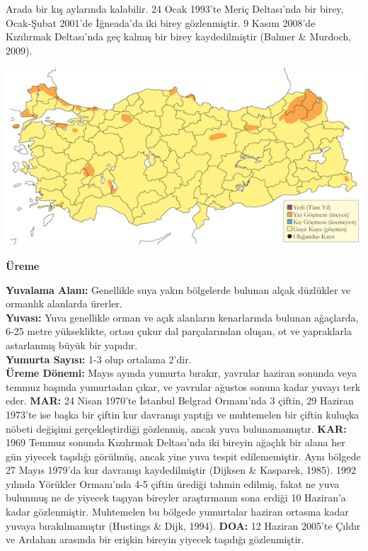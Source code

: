 \documentclass[
  a4paper,
  DIV=11,
  numbers=noendperiod]{scrreprt}
\begin{document}
Arada bir kış aylarında kalabilir. 24 Ocak 1993'te Meriç Deltası'nda bir
birey, Ocak-Şubat 2001'de İğneada'da iki birey gözlenmiştir. 9 Kasım
2008'de Kızılırmak Deltası'nda geç kalmış bir birey kaydedilmiştir
(Balmer \& Murdoch, 2009).

\includegraphics{images/harita_Page_091.png}

\textbf{Üreme}

\textbf{Yuvalama Alanı:} Genellikle suya yakın bölgelerde bulunan alçak
düzlükler ve ormanlık alanlarda ürerler.\\
\textbf{Yuvası:} Yuva genellikle orman ve açık alanların kenarlarında
bulunan ağaçlarda, 6-25 metre yükseklikte, ortası çukur dal
parçalarından oluşan, ot ve yapraklarla astarlanmış büyük bir yapıdır.\\
\textbf{Yumurta Sayısı:} 1-3 olup ortalama 2'dir.\\
\textbf{Üreme Dönemi:} Mayıs ayında yumurta bırakır, yavrular haziran
sonunda veya temmuz başında yumurtadan çıkar, ve yavrular ağustos sonuna
kadar yuvayı terk eder. \textbf{MAR:} 24 Nisan 1970'te İstanbul Belgrad
Ormanı'nda 3 çiftin, 29 Haziran 1973'te ise başka bir çiftin kur
davranışı yaptığı ve muhtemelen bir çiftin kuluçka nöbeti değişimi
gerçekleştirdiği gözlenmiş, ancak yuva bulunamamıştır. \textbf{KAR:}
1969 Temmuz sonunda Kızılırmak Deltası'nda iki bireyin ağaçlık bir alana
her gün yiyecek taşıdığı görülmüş, ancak yine yuva tespit edilememiştir.
Aynı bölgede 27 Mayıs 1979'da kur davranışı kaydedilmiştir (Dijksen \&
Kasparek, 1985). 1992 yılında Yörükler Ormanı'nda 4-5 çiftin ürediği
tahmin edilmiş, fakat ne yuva bulunmuş ne de yiyecek taşıyan bireyler
araştırmanın sona erdiği 10 Haziran'a kadar gözlenmiştir. Muhtemelen bu
bölgede yumurtalar haziran ortasına kadar yuvaya bırakılmamıştır
(Hustings \& Dijk, 1994). \textbf{DOA:} 12 Haziran 2005'te Çıldır ve
Ardahan arasında bir erişkin bireyin yiyecek taşıdığı gözlenmiştir.
\end{document}
